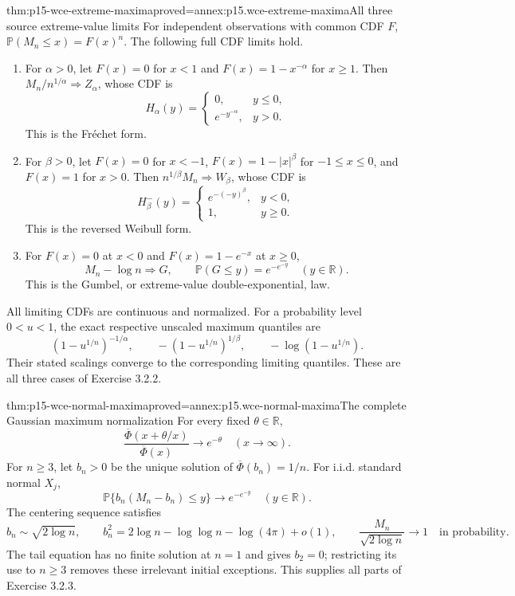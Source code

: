 \begin{hbtheorem}{thm:p15-wce-extreme-maxima}{proved=annex:p15.wce-extreme-maxima}{All three source extreme-value limits}
For independent observations with common CDF \(F\),
\(\mathbb P(M_n\leq x)=F(x)^n\). The following full CDF limits
hold.
\begin{enumerate}
\item For \(\alpha>0\), let \(F(x)=0\) for \(x<1\) and
 \(F(x)=1-x^{-\alpha}\) for \(x\geq1\). Then
 \(M_n/n^{1/\alpha}\Rightarrow Z_\alpha\), whose CDF is
 \[
  H_\alpha(y)=
  \begin{cases}0,&y\leq0,\\ e^{-y^{-\alpha}},&y>0.\end{cases}
 \]
 This is the Fr\'echet form.
\item For \(\beta>0\), let \(F(x)=0\) for \(x<-1\),
 \(F(x)=1-|x|^\beta\) for \(-1\leq x\leq0\), and
 \(F(x)=1\) for \(x>0\). Then \(n^{1/\beta}M_n\Rightarrow W_\beta\),
 whose CDF is
 \[
  H_\beta^-(y)=
  \begin{cases}e^{-(-y)^\beta},&y<0,\\1,&y\geq0.\end{cases}
 \]
 This is the reversed Weibull form.
\item For \(F(x)=0\) at \(x<0\) and \(F(x)=1-e^{-x}\)
 at \(x\geq0\),
 \[
  M_n-\log n\Rightarrow G,\qquad
  \mathbb P(G\leq y)=e^{-e^{-y}}\quad(y\in\mathbb R).
 \]
 This is the Gumbel, or extreme-value double-exponential, law.
\end{enumerate}
All limiting CDFs are continuous and normalized.
For a probability level \(0<u<1\), the exact respective
unscaled maximum quantiles are
\[
 (1-u^{1/n})^{-1/\alpha},\qquad
 -(1-u^{1/n})^{1/\beta},\qquad
 -\log(1-u^{1/n}).
 \]
Their stated scalings converge to the corresponding limiting
quantiles. These are all three cases of Exercise 3.2.2.
\end{hbtheorem}

\begin{hbtheorem}{thm:p15-wce-normal-maxima}{proved=annex:p15.wce-normal-maxima}{The complete Gaussian maximum normalization}
For every fixed \(\theta\in\mathbb R\),
\[
 \frac{\overline\Phi(x+\theta/x)}{\overline\Phi(x)}
                                    \longrightarrow e^{-\theta}
                                      \quad(x\to\infty).
 \]
For \(n\geq3\), let \(b_n>0\) be the unique solution of
\(\overline\Phi(b_n)=1/n\).
For i.i.d. standard normal \(X_j\),
\[
 \mathbb P\{b_n(M_n-b_n)\leq y\}\longrightarrow e^{-e^{-y}}
                                               \quad(y\in\mathbb R).
 \]
The centering sequence satisfies
\[
 b_n\sim\sqrt{2\log n},\qquad
 b_n^2=2\log n-\log\log n-\log(4\pi)+o(1),
 \qquad
 \frac{M_n}{\sqrt{2\log n}}\longrightarrow1
                                     \quad\text{in probability}.
 \]
The tail equation has no finite solution at \(n=1\) and gives
\(b_2=0\); restricting its use to \(n\geq3\) removes these
irrelevant initial exceptions. This supplies all parts of Exercise 3.2.3.
\end{hbtheorem}

